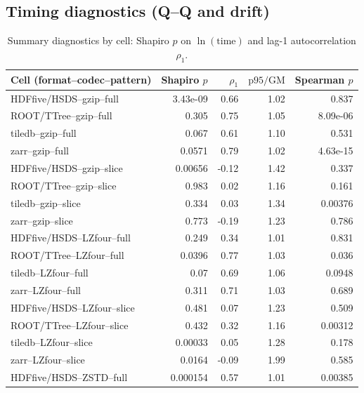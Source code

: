 \documentclass[nomenclature, english, bibtex]{kththesis}
\numberwithin{listing}{chapter}
\begin{document}
\subsection{Timing diagnostics (Q–Q and drift)}
\begin{table}[H]
  \centering
  \caption{Summary diagnostics by cell: Shapiro $p$ on $\ln(\text{time})$ and lag-1 autocorrelation $\rho_1$.}
  \label{tab:timing_diag_main}
  \begin{tabular}{l r r r r}
    \hline
    Cell (format–codec–pattern) & Shapiro $p$ & $\rho_1$ & $\mathrm{p95}/\mathrm{GM}$ & Spearman $p$ \\
    \hline
    \gls{HDFfive}/\gls{HSDS}–gzip–full    & 3.43e-09 & 0.66  & 1.02 & 0.837 \\
    \gls{ROOT}/\gls{TTree}–gzip–full    & 0.305    & 0.75  & 1.05 & 8.09e-06 \\
    tiledb–gzip–full  & 0.067    & 0.61  & 1.10 & 0.531 \\
    zarr–gzip–full    & 0.0571   & 0.79  & 1.02 & 4.63e-15 \\
    \gls{HDFfive}/\gls{HSDS}–gzip–slice   & 0.00656  & -0.12 & 1.42 & 0.337 \\
    \gls{ROOT}/\gls{TTree}–gzip–slice   & 0.983    & 0.02  & 1.16 & 0.161 \\
    tiledb–gzip–slice & 0.334    & 0.03  & 1.34 & 0.00376 \\
    zarr–gzip–slice   & 0.773    & -0.19 & 1.23 & 0.786 \\
    \gls{HDFfive}/\gls{HSDS}–\gls{LZfour}–full     & 0.249    & 0.34  & 1.01 & 0.831 \\
    \gls{ROOT}/\gls{TTree}–\gls{LZfour}–full     & 0.0396   & 0.77  & 1.03 & 0.036 \\
    tiledb–\gls{LZfour}–full   & 0.07     & 0.69  & 1.06 & 0.0948 \\
    zarr–\gls{LZfour}–full     & 0.311    & 0.71  & 1.03 & 0.689 \\
    \gls{HDFfive}/\gls{HSDS}–\gls{LZfour}–slice    & 0.481    & 0.07  & 1.23 & 0.509 \\
    \gls{ROOT}/\gls{TTree}–\gls{LZfour}–slice    & 0.432    & 0.32  & 1.16 & 0.00312 \\
    tiledb–\gls{LZfour}–slice  & 0.00033  & 0.05  & 1.28 & 0.178 \\
    zarr–\gls{LZfour}–slice    & 0.0164   & -0.09 & 1.99 & 0.585 \\
    \gls{HDFfive}/\gls{HSDS}–\gls{ZSTD}–full    & 0.000154 & 0.57  & 1.01 & 0.00385 \\

\end{tabular}
\end{table}
\end{document}
